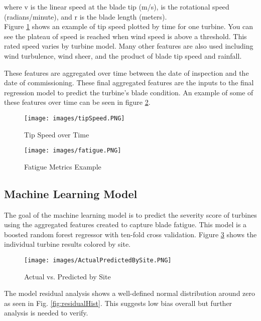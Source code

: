 \documentclass[runningheads]{llncs}
\begin{document}
where v is the linear speed at the blade tip (m/s), \textomega\space is the rotational speed (radians/minute), and r is the blade length (meters). \\

Figure \ref{fig:tip} shows an example of tip speed plotted by time for one turbine. You can see the plateau of speed is reached when wind speed is above a threshold. This rated speed varies by turbine model. 
Many other features are also used including wind turbulence, wind sheer, and the product of blade tip speed and rainfall. 

These features are aggregated over time between the date of inspection and the date of commissioning. These final aggregated features are the inputs to the final regression model to predict the turbine's blade condition. An example of some of these features over time can be seen in figure \ref{fig:fatigue}.

  \begin{figure}[H]
    \centering
    \texttt{[image: images/tipSpeed.PNG]}
    \caption{Tip Speed over Time}
    \label{fig:tip}
\end{figure}

\begin{figure}[H]
    \centering
    \texttt{[image: images/fatigue.PNG]}
    \caption{Fatigue Metrics Example}
    \label{fig:fatigue}
\end{figure}

\subsection{Machine Learning Model}

The goal of the machine learning model is to predict the severity score of turbines using the aggregated features created to capture blade fatigue. This model is a boosted random forest regressor with ten-fold cross validation. Figure \ref{fig:predictionSite} shows the individual turbine results colored by site.

\begin{figure}[H]
    \centering
    \texttt{[image: images/ActualPredictedBySite.PNG]}
    \caption{Actual vs. Predicted by Site}
    \label{fig:predictionSite}
\end{figure}

The model residual analysis shows a well-defined normal distribution around zero as seen in Fig. \ref{fig:residualHist}. This suggests low bias overall but further analysis is needed to verify.
\end{document}
